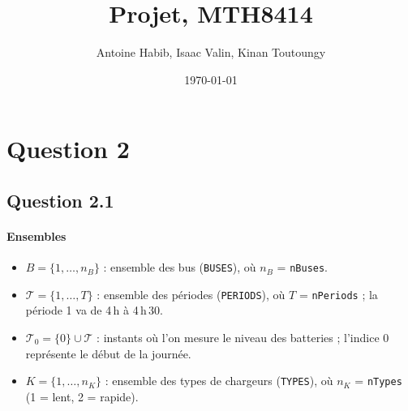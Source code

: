 \documentclass{article}
\title{Projet, MTH8414}
\author{Antoine Habib, Isaac Valin, Kinan Toutoungy}
\date{\today}
\begin{document}
\maketitle

\section*{Question 2}

\subsection*{Question 2.1}
\paragraph{Ensembles}
\begin{itemize}
  \item $B = \{1, \dots, n_B\}$ : ensemble des bus (\texttt{BUSES}), où $n_B$ = \texttt{nBuses}.
  \item $\mathcal{T} = \{1, \dots, T\}$ : ensemble des périodes (\texttt{PERIODS}), où $T$ = \texttt{nPeriods} ; la période 1 va de 4\,h à 4\,h\,30.
  \item $\mathcal{T}_0 = \{0\} \cup \mathcal{T}$ : instants où l'on mesure le niveau des batteries ; l'indice 0 représente le début de la journée.
  \item $K = \{1, \dots, n_K\}$ : ensemble des types de chargeurs (\texttt{TYPES}), où $n_K$ = \texttt{nTypes} (1 = lent, 2 = rapide).
\end{itemize}
\end{document}
